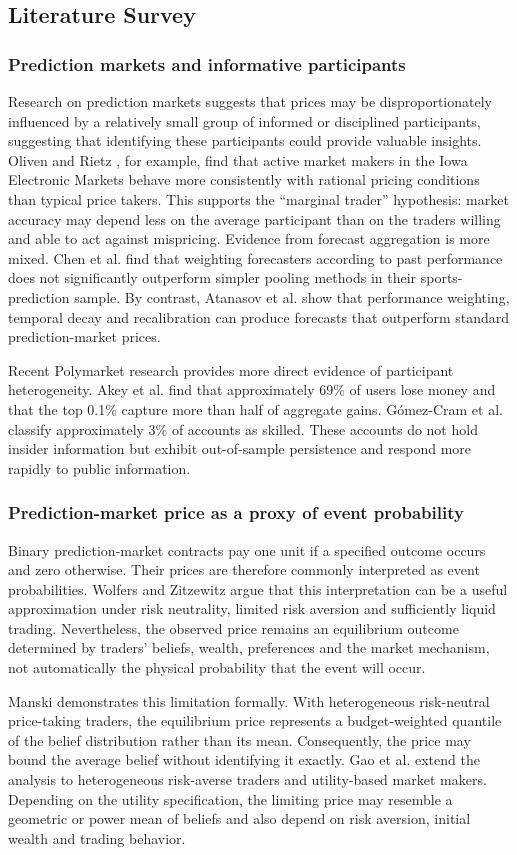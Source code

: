 \clearpage\subsection{Literature Survey}
\subsubsection{Prediction markets and informative participants}
Research on prediction markets suggests that prices may be disproportionately influenced by a relatively small group of informed or disciplined participants, suggesting that identifying these participants could provide valuable insights. Oliven and Rietz \cite{Oliven}, for example, find that active market makers in the Iowa Electronic Markets behave more consistently with rational pricing conditions than typical price takers. This supports the “marginal trader” hypothesis: market accuracy may depend less on the average participant than on the traders willing and able to act against mispricing. Evidence from forecast aggregation is more mixed. Chen et al. \cite{chen} find that weighting forecasters according to past performance does not significantly outperform simpler pooling methods in their sports-prediction sample. By contrast, Atanasov et al. \cite{atanasov} show that performance weighting, temporal decay and recalibration can produce forecasts that outperform standard prediction-market prices.

Recent Polymarket research provides more direct evidence of participant heterogeneity. Akey et al. \cite{akey} find that approximately 69\% of users lose money and that the top 0.1\% capture more than half of aggregate gains. Gómez-Cram et al. \cite{gomez} classify approximately 3\% of accounts as skilled. These accounts do not hold insider information but exhibit out-of-sample persistence and respond more rapidly to public information.

\subsubsection{Prediction-market price as a proxy of event probability}
Binary prediction-market contracts pay one unit if a specified outcome occurs and zero otherwise. Their prices are therefore commonly interpreted as event probabilities. Wolfers and Zitzewitz \cite{wolfers2004} argue that this interpretation can be a useful approximation under risk neutrality, limited risk aversion and sufficiently liquid trading. Nevertheless, the observed price remains an equilibrium outcome determined by traders' beliefs, wealth, preferences and the market mechanism, not automatically the physical probability that the event will occur.

Manski \cite{manski} demonstrates this limitation formally. With heterogeneous risk-neutral price-taking traders, the equilibrium price represents a budget-weighted quantile of the belief distribution rather than its mean. Consequently, the price may bound the average belief without identifying it exactly. Gao et al. \cite{gao} extend the analysis to heterogeneous risk-averse traders and utility-based market makers. Depending on the utility specification, the limiting price may resemble a geometric or power mean of beliefs and also depend on risk aversion, initial wealth and trading behavior.
